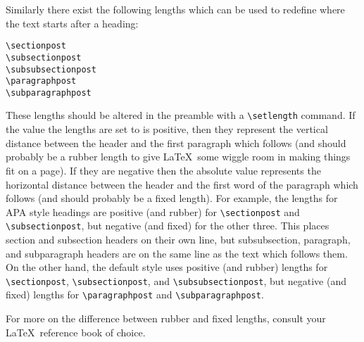 Similarly there exist the following lengths which can be used to redefine where the text starts after a heading:
\begin{verbatim}
\sectionpost
\subsectionpost
\subsubsectionpost
\paragraphpost
\subparagraphpost
\end{verbatim}
These lengths should be altered in the preamble with a \verb=\setlength= command.  If the value the lengths are set to is positive, then they represent the vertical distance between the header and the first paragraph which follows (and should probably be a rubber length to give \LaTeX\ some wiggle room in making things fit on a page).  If they are negative then the absolute value represents the horizontal distance between the header and the first word of the paragraph which follows (and should probably be a fixed length).  For example, the lengths for APA style headings are positive (and rubber) for \verb=\sectionpost= and \verb=\subsectionpost=, but negative (and fixed) for the other three.  This places section and subsection headers on their own line, but subsubsection, paragraph, and subparagraph headers are on the same line as the text which follows them.  On the other hand, the default style uses positive (and rubber) lengths for \verb=\sectionpost=, \verb=\subsectionpost=, and \verb=\subsubsectionpost=, but negative (and fixed) lengths for \verb=\paragraphpost= and \verb=\subparagraphpost=.

For more on the difference between rubber and fixed lengths, consult your \LaTeX\ reference book of choice.
\endinput